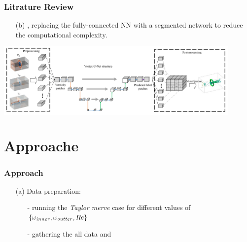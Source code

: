 \documentclass[aspectratio=169]{beamer}
\begin{document}
\begin{frame}
  \frametitle{Litrature Review}
  \begin{itemize}
    \item[(b)] \cite{Wang2021}, replacing the fully-connected NN with a segmented network to reduce the computational complexity.
  \end{itemize}
  \begin{center}
    \includegraphics[width=0.9\textwidth]{U-net.png}
  \end{center}
\end{frame}

\section{Approache}
\begin{frame}
  \frametitle{Approach}
  \begin{itemize}
    \item[(a)] Data preparation:
    \begin{itemize}
      \item[-] running the  \textit{Taylor merve} case for different values of  $\{\omega_{inner}, \omega_{outter}, \mathnormal{Re}\}$
      \item[-] gathering the all data and 
    \end{itemize} 
  \end{itemize}
\end{frame}
\end{document}
